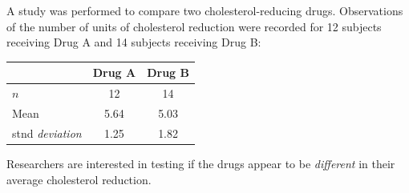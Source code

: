 A study was performed to compare two cholesterol-reducing drugs.  Observations of the number of units of cholesterol reduction were recorded for 12 subjects receiving Drug A and 14 subjects receiving Drug B:
\begin{center}
\begin{tabular}{|l|c|c|}
  \hline
  \  & \textbf{Drug A} & \textbf{Drug B} \\\hline
  $n$ & 12  & 14 \\
  Mean & 5.64 & 5.03 \\
  stnd \textit{deviation} & 1.25 & 1.82 \\
  \hline
\end{tabular}
\end{center}
Researchers are interested in testing if the drugs appear to be \emph{different} in their average cholesterol reduction.
